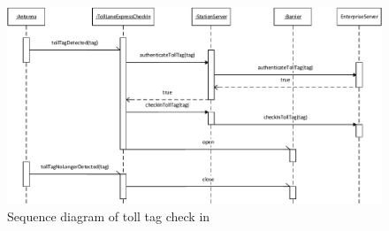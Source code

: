 \begin{figure}[H]
\centerline{\includegraphics[width=1.4\columnwidth]{img/sequence_diagrams/sequence_diagram_toll_tag_check_in}}
\caption{Sequence diagram of toll tag check in}
\label{fig:seq_check_in_toll_tag}
\end{figure}

